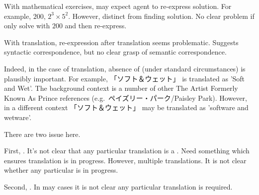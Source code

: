 \begin{note}
  With mathematical exercises, may expect agent to re-express solution.
  For example, \(200\), \(2^{3} \times 5^{2}\).
  However, distinct from finding solution.
  No clear problem if only solve with \(200\) and then re-express.
  
  With translation, re-expression after translation seems problematic.
  Suggests syntactic correspondence, but no clear grasp of semantic correspondence.
  
  Indeed, in the case of translation, absence of \fc{} (under standard circumstances) is plausibly important.
  For example, 「ソフト＆ウェット」 is translated as 'Soft and Wet'.
  The background context is a number of other The Artist Formerly Known As Prince references (e.g.\ ペイズリー・パーク/Paisley Park).
  However, in a different context 「ソフト＆ウェット」 may be translated as 'software and wetware'.
\end{note}


\begin{note}
  There are two issue here.

  First, .
  It's not clear that any particular translation is a \fc{}.
  Need something which ensures translation is in progress.
  However, multiple translations.
  It is not clear whether any particular is in progress.

  Second, \tpro{}.
  In may cases it is not clear any particular translation is required.
\end{note}


